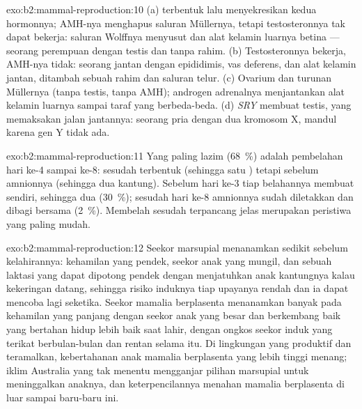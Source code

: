 \begin{solution}{exo:b2:mammal-reproduction:10}
(a)  terbentuk lalu menyekresikan kedua hormonnya;
AMH-nya menghapus saluran Müllernya, tetapi testosteronnya tak dapat bekerja:
saluran Wolffnya menyusut dan alat kelamin luarnya betina --- seorang
perempuan dengan testis dan tanpa rahim. (b) Testosteronnya bekerja,
AMH-nya tidak: seorang jantan dengan epididimis, vas deferens, dan alat
kelamin jantan, ditambah sebuah rahim dan saluran telur. (c) Ovarium
dan turunan Müllernya (tanpa testis, tanpa AMH); androgen adrenalnya
menjantankan alat kelamin luarnya sampai taraf yang berbeda-beda. (d)
\emph{SRY} membuat testis, yang memaksakan jalan jantannya: seorang
pria dengan dua kromosom X, mandul karena gen Y 
tidak ada.
\end{solution}

\begin{solution}{exo:b2:mammal-reproduction:11}
Yang paling lazim (\qty{68}{\%}) adalah pembelahan hari ke-4 sampai
ke-8: sesudah  terbentuk (sehingga satu ) tetapi
sebelum amnionnya (sehingga dua kantung). Sebelum hari ke-3 tiap
belahannya membuat  sendiri, sehingga dua 
(\qty{30}{\%}); sesudah hari ke-8 amnionnya sudah diletakkan dan
dibagi bersama (\qty{2}{\%}). Membelah  sesudah
 terpancang jelas merupakan peristiwa yang paling mudah.
\end{solution}

\begin{solution}{exo:b2:mammal-reproduction:12}
Seekor marsupial menanamkan sedikit sebelum kelahirannya: kehamilan
yang pendek, seekor anak yang mungil, dan sebuah laktasi yang dapat
dipotong pendek dengan menjatuhkan anak kantungnya kalau kekeringan
datang, sehingga risiko induknya tiap upayanya rendah dan ia dapat
mencoba lagi seketika. Seekor mamalia berplasenta menanamkan banyak
pada kehamilan yang panjang dengan seekor anak yang besar dan
berkembang baik yang bertahan hidup lebih baik saat lahir, dengan
ongkos seekor induk yang terikat berbulan-bulan dan rentan selama itu.
Di lingkungan yang produktif dan teramalkan, kebertahanan anak mamalia
berplasenta yang lebih tinggi menang; iklim Australia yang tak menentu
mengganjar pilihan marsupial untuk meninggalkan anaknya, dan
keterpencilannya menahan mamalia berplasenta di luar sampai baru-baru
ini.
\end{solution}

